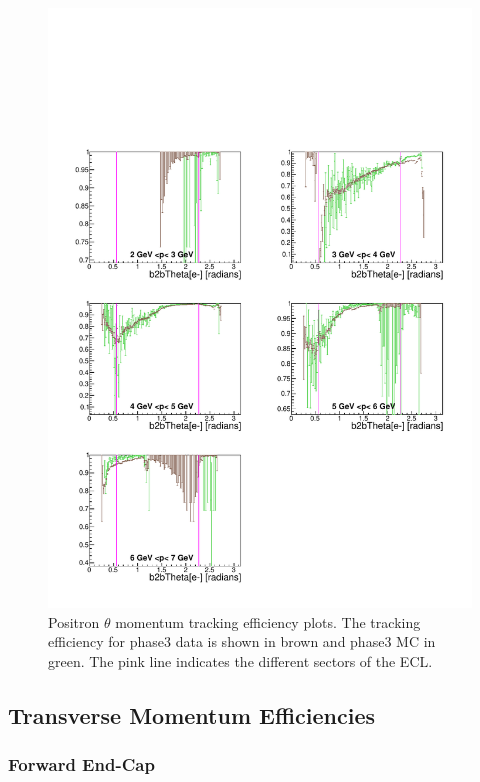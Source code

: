\documentclass[a4paper,11pt,twosided,final,german,openbib,pdftex,listof=totoc,bibliography=totoc]{scrbook}
\begin{document}
\begin{figure}[!htbp]
	\centering
	\includegraphics[width=\textwidth]{Plots/master3/xPMThetaepP3}
	\caption[Momentum $\theta$ Positron Efficiency Phase3]{Positron $\theta$ momentum tracking efficiency plots. The tracking efficiency for phase3 data is shown in brown and phase3 MC in green. The pink line indicates the different sectors of the ECL.}
	\label{plt:xPMThetaep3}
\end{figure}

\newpage
\subsection{Transverse Momentum Efficiencies}

\subsubsection{Forward End-Cap}
\end{document}
